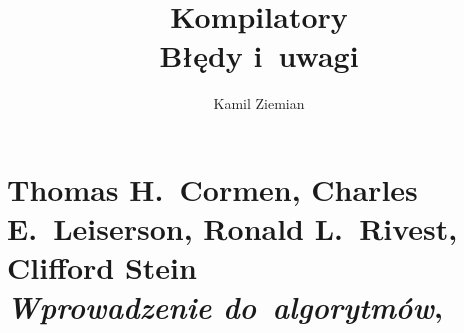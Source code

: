 \documentclass[a4paper,11pt]{article}
\title{Kompilatory \\
  {\Large Błędy i~uwagi}}
\author{Kamil Ziemian}
\numberwithin{equation}{section}
\begin{document}





\maketitle  %





\section{Thomas H.~Cormen, Charles E.~Leiserson, Ronald L.~Rivest, Clifford Stein \\
  \textit{Wprowadzenie do~algorytmów},
  \cite{CormenAtAlWprowadzenieDoAlgorytmow2022}}

\vspace{0em}



\vspace{0em}



\end{document}
